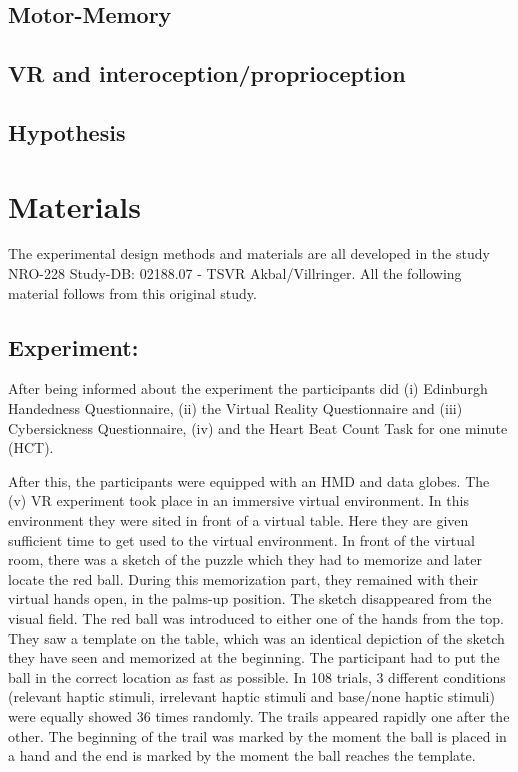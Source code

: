 \documentclass{article}
\begin{document}
\subsection{Motor-Memory}


\subsection{VR and interoception/proprioception}


\subsection{Hypothesis}



\section{Materials}

The experimental design methods and materials are all developed in the study NRO-228 Study-DB: 02188.07 - TSVR Akbal/Villringer. All the following material follows from this original study.

\subsection{Experiment:}

After being informed about the experiment the participants did (i) Edinburgh Handedness Questionnaire, (ii) the Virtual Reality Questionnaire and (iii) Cybersickness Questionnaire, (iv) and the Heart Beat Count Task for one minute (HCT). 

After this, the participants were equipped with an HMD and data globes. The (v) VR experiment took place in an immersive virtual environment. In this environment they were sited in front of a virtual table. Here they are given sufficient time to get used to the virtual environment. In front of the virtual room, there was a sketch of the puzzle which they had to memorize and later locate the red ball. During this memorization part, they remained with their virtual hands open, in the palms-up position. The sketch disappeared from the visual field. The red ball was introduced to either one of the hands from the top. They saw a template on the table, which was an identical depiction of the sketch they have seen and memorized at the beginning. The participant had to put the ball in the correct location as fast as possible. In 108 trials, 3 different conditions (relevant haptic stimuli, irrelevant haptic stimuli and base/none haptic stimuli) were equally showed 36 times randomly. The trails appeared rapidly one after the other. The beginning  of the trail was marked by the moment the ball is placed in a hand and the end is marked by the moment the ball reaches the template.
\end{document}
